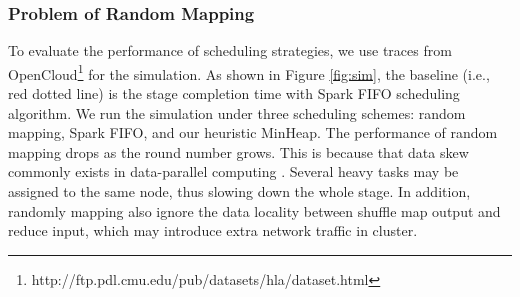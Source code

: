 \subsubsection{Problem of Random Mapping}\label{randomassign}
{\color{blue}
To evaluate the performance of scheduling strategies, we use traces from OpenCloud\footnote{\label{fn:trace}http://ftp.pdl.cmu.edu/pub/datasets/hla/dataset.html} for the simulation.
As shown in Figure \ref{fig:sim}, the baseline (i.e., red dotted line) is the stage completion time with Spark FIFO scheduling algorithm. 
We run the simulation under three scheduling schemes: random mapping, Spark FIFO, and our heuristic MinHeap.
The performance of random mapping drops as the round number grows. 
This is because that data skew commonly exists in data-parallel computing \cite{skewtune}. 
Several heavy tasks may be assigned to the same node, thus slowing down the whole stage. 
In addition, randomly mapping also ignore the data locality between shuffle map output and reduce input, which may introduce extra network traffic in cluster.
}
	
